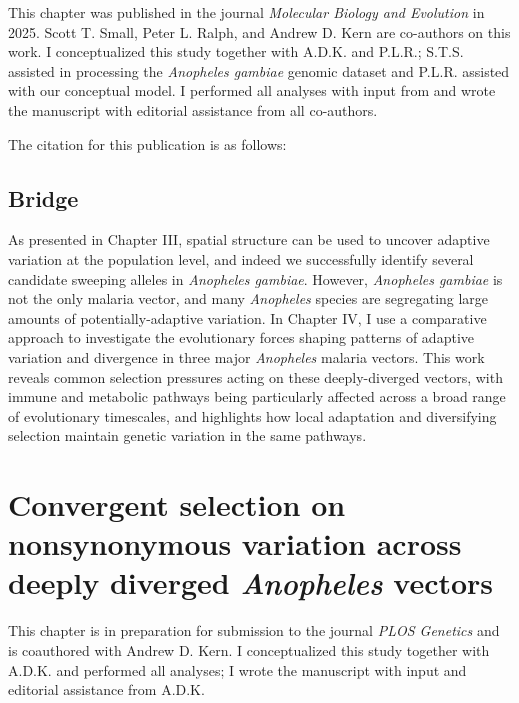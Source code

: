 \bigskip
This chapter was published in the journal \textit{Molecular Biology and Evolution} in 2025.
Scott T. Small, Peter L. Ralph, and Andrew D. Kern are co-authors on this work.
I conceptualized this study together with A.D.K. and P.L.R.; S.T.S. assisted in processing the 
\textit{Anopheles gambiae} genomic dataset and P.L.R. assisted with our conceptual model.
I performed all analyses with input from and wrote the manuscript with editorial assistance from all co-authors.

\bigskip
The citation for this publication is as follows:

\bigskip



\newpage
\section{Bridge}

As presented in Chapter III, spatial structure can be used to uncover adaptive variation at the population level, and indeed we successfully identify
several candidate sweeping alleles in \textit{Anopheles gambiae}. 
However, \textit{Anopheles gambiae} is not the only malaria vector, and many \textit{Anopheles} species are segregating large amounts of potentially-adaptive variation.
In Chapter IV, I use a comparative approach to investigate the evolutionary forces shaping patterns of adaptive variation and divergence in 
three major \textit{Anopheles} malaria vectors.
This work reveals common selection pressures acting on these deeply-diverged vectors, with immune and metabolic pathways being particularly affected across a broad range of evolutionary timescales,
and highlights how local adaptation and diversifying selection maintain genetic variation in the same pathways.

\chapter{Convergent selection on nonsynonymous variation across deeply diverged \textit{Anopheles} vectors}

\bigskip
This chapter is in preparation for submission to the journal \textit{PLOS Genetics} and is coauthored with 
Andrew D. Kern. I conceptualized this study together with A.D.K. and performed all analyses; I wrote the manuscript 
with input and editorial assistance from A.D.K.










